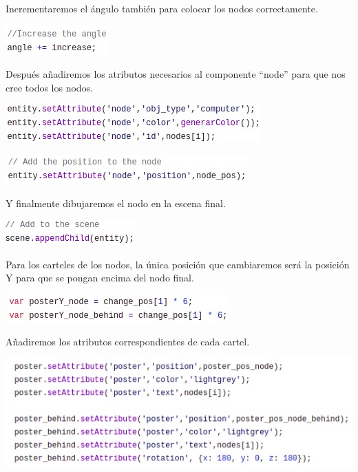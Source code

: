 \documentclass[a4paper, 12pt]{book}
\begin{document}
Incrementaremos el ángulo también para colocar los nodos correctamente.

\begin{center}
    \includegraphics[scale=0.7]{img/angleincr_comp_netsim.png}
\end{center}


Después añadiremos los atributos necesarios al componente “node” para que nos cree todos los nodos.


\begin{center}
    \includegraphics[scale=0.7]{img/node1_comp_netsim.png}
\end{center}


\begin{center}
    \includegraphics[scale=0.7]{img/node2_comp_netsim.png}
\end{center}

Y finalmente dibujaremos el nodo en la escena final.

\begin{center}
    \includegraphics[scale=0.7]{img/escenanode_comp_netsim.png}
\end{center}

Para los carteles de los nodos, la única posición que cambiaremos será la posición Y para que se pongan encima del nodo final.

\begin{center}
    \includegraphics[scale=0.7]{img/posterY_comp_netsim.png}
\end{center}

\newpage
Añadiremos los atributos correspondientes de cada cartel.

\begin{center}
    \includegraphics[scale=0.7]{img/atribposter_comp_netsim.png}
\end{center}
\end{document}
